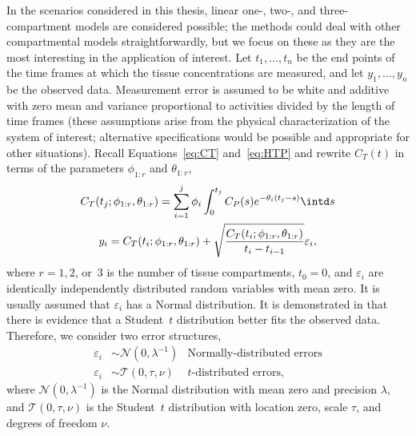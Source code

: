 In the scenarios considered in this thesis, linear one-, two-, and
three-compartment models are considered possible; the methods could deal with
other compartmental models straightforwardly, but we focus on these as they
are the most interesting in the application of interest. Let $t_1, \dots,
t_n$ be the end points of the time frames at which the tissue concentrations
are measured, and let $y_1,\dots,y_n$ be the observed data. Measurement error
is assumed to be white and additive with zero mean and variance proportional
to activities divided by the length of time frames (these assumptions arise
from the physical characterization of the \pet system of interest;
alternative specifications would be possible and appropriate for other
situations). Recall Equations~\eqref{eq:CT} and~\eqref{eq:HTP} and rewrite $C_T(t)$ in terms of the parameters $\phi_{1:r}$ and $\theta_{1:r}$,
\begin{gather*}
  C_T(t_j;\phi_{1:r},\theta_{1:r}) =
  \sum_{i=1}^j \phi_i\int_0^{t_j}C_P(s)e^{-\theta_i(t_j-s)} \intd s \\
  y_i = C_T(t_i;\phi_{1:r},\theta_{1:r}) +
  \sqrt{\frac{C_T(t_i;\phi_{1:r},\theta_{1:r})} {t_i - t_{i-1}}}
  \varepsilon_i,
\end{gather*}
where $r = 1, 2$, or~$3$ is the number of tissue compartments, $t_0 = 0$, and
$\varepsilon_i$ are identically independently distributed random variables
with mean zero. It is usually assumed that $\varepsilon_i$ has a Normal
distribution. It is demonstrated in \cite{Zhou2013} that there is evidence
that a Student~$t$ distribution better fits the observed data. Therefore, we
consider two error structures,
\begin{align*}
  \varepsilon_i &\sim \mathcal{N}(0,\lambda^{-1})
  &\text{Normally-distributed errors} \\
  \varepsilon_i &\sim \mathcal{T}(0,\tau,\nu)
  &\text{$t$-distributed errors},
\end{align*}
where $\mathcal{N}(0,\lambda^{-1})$ is the Normal distribution with mean zero
and precision $\lambda$, and $\mathcal{T}(0,\tau,\nu)$ is the Student~$t$
distribution with location zero, scale $\tau$, and degrees of freedom $\nu$.

